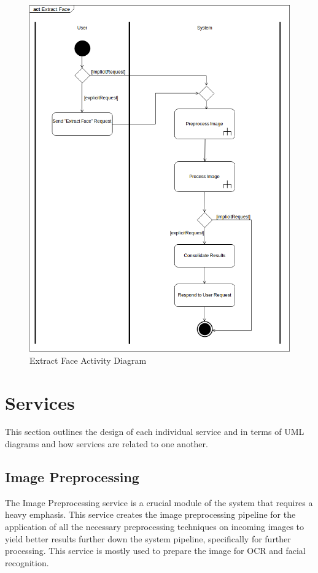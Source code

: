 \documentclass{article}
\begin{document}
	\begin{figure}[h]
		\centering
		\includegraphics[scale=0.5]{img/extract_face_activity.png}
		\caption{Extract Face Activity Diagram}
	\end{figure}
\pagebreak
	 
\section{Services}
This section outlines the design of each individual service and in terms of UML diagrams and how services are related to one another.

\subsection{Image Preprocessing}
The Image Preprocessing service is a crucial module of the system that requires a heavy emphasis. This service creates the image preprocessing pipeline for the application of all the necessary preprocessing techniques on incoming images to yield better results further down the system pipeline, specifically for further processing. This service is mostly used to prepare the image for OCR and facial recognition. 
\end{document}
